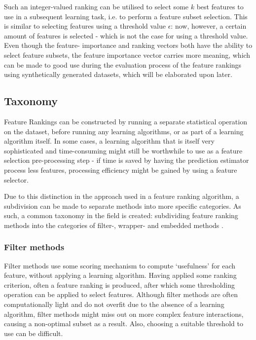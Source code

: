 \documentclass[../main.tex]{subfiles}
\begin{document}
Such an integer-valued ranking can be utilised to select some $k$ best features to use in a subsequent learning task, i.e. to perform a feature subset selection. This is similar to selecting features using a threshold value $\epsilon$: now, however, a certain amount of features is selected - which is not the case for using a threshold value. Even though the feature- importance and ranking vectors both have the ability to select feature subsets, the feature importance vector carries more meaning, which can be made to good use during the evaluation process of the feature rankings using synthetically generated datasets, which will be elaborated upon later.




\subsection{Taxonomy}
Feature Rankings can be constructed by running a separate statistical operation on the dataset, before running any learning algorithms, or as part of a learning algorithm itself. In some cases, a learning algorithm that is itself very sophisticated and time-consuming might still be worthwhile to use as a feature selection pre-processing step - if time is saved by having the prediction estimator process less features, processing efficiency might be gained by using a feature selector.

Due to this distinction in the approach used in a feature ranking algorithm, a subdivision can be made to separate methods into more specific categories. As such, a common taxonomy in the field is created: subdividing feature ranking methods into the categories of filter-, wrapper- and embedded methods \citep{chandrashekar_survey_2014}.



\subsubsection{Filter methods}
Filter methods use some scoring mechanism to compute \lq usefulness' for each feature, without applying a learning algorithm. Having applied some ranking criterion, often a feature ranking is produced, after which some thresholding operation can be applied to select features. Although filter methods are often computationally light and do not overfit due to the absence of a learning algorithm, filter methods might miss out on more complex feature interactions, causing a non-optimal subset as a result. Also, choosing a suitable threshold to use can be difficult.
\end{document}
